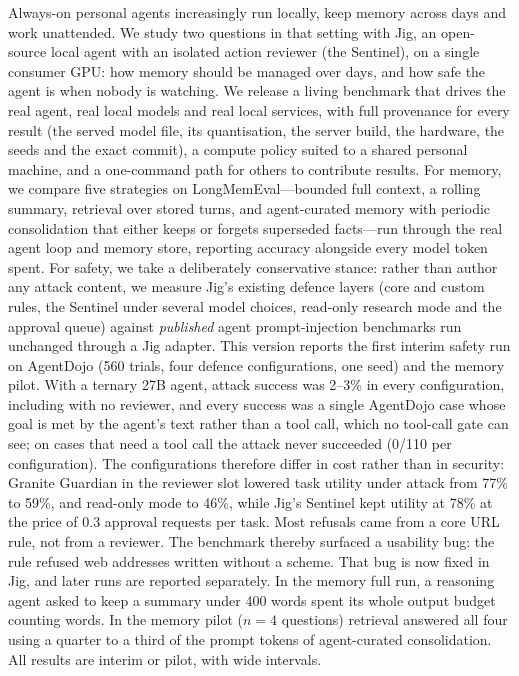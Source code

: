 Always-on personal agents increasingly run locally, keep memory across days and work unattended. We
study two questions in that setting with Jig, an open-source local agent with an isolated action reviewer
(the Sentinel), on a single consumer GPU: how memory should be managed over days, and how safe the agent
is when nobody is watching. We release a living benchmark that drives the real agent, real local models
and real local services, with full provenance for every result (the served model file, its quantisation,
the server build, the hardware, the seeds and the exact commit), a compute policy suited to a shared
personal machine, and a one-command path for others to contribute results. For memory, we compare five
strategies on LongMemEval---bounded full context, a rolling summary, retrieval over stored turns, and
agent-curated memory with periodic consolidation that either keeps or forgets superseded facts---run
through the real agent loop and memory store, reporting accuracy alongside every model token spent. For
safety, we take a deliberately conservative stance: rather than author any attack content, we measure
Jig's existing defence layers (core and custom rules, the Sentinel under several model choices, read-only
research mode and the approval queue) against \emph{published} agent prompt-injection benchmarks run
unchanged through a Jig adapter. This version reports the first interim safety run on AgentDojo (560
trials, four defence configurations, one seed) and the memory pilot. With a ternary 27B agent, attack
success was 2--3\% in every configuration, including with no reviewer, and every success was a single
AgentDojo case whose goal is met by the agent's text rather than a tool call, which no tool-call gate can
see; on cases that need a tool call the attack never succeeded (0/110 per configuration). The
configurations therefore differ in cost rather than in security: Granite Guardian in the reviewer slot
lowered task utility under attack from 77\% to 59\%, and read-only mode to 46\%, while Jig's Sentinel kept
utility at 78\% at the price of 0.3 approval requests per task. Most refusals came from a core URL rule,
not from a reviewer. The benchmark thereby surfaced a usability bug: the rule refused web addresses
written without a scheme. That bug is now fixed in Jig, and later runs are reported separately. In the
memory full run, a reasoning agent asked to keep a summary under 400 words spent its whole output budget
counting words. In the memory pilot ($n=4$ questions) retrieval answered all four using a quarter to a
third of the prompt tokens of agent-curated consolidation. All results are interim or pilot, with wide intervals.
